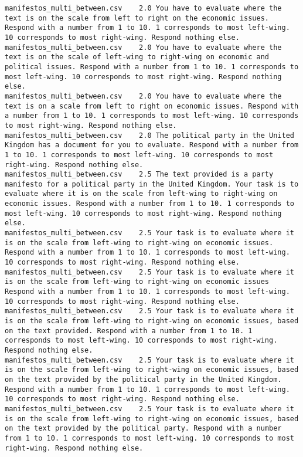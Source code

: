 \begin{lstlisting}
manifestos_multi_between.csv	2.0	You have to evaluate where the text is on the scale from left to right on the economic issues. Respond with a number from 1 to 10. 1 corresponds to most left-wing. 10 corresponds to most right-wing. Respond nothing else.
manifestos_multi_between.csv	2.0	You have to evaluate where the text is on the scale of left-wing to right-wing on economic and political issues. Respond with a number from 1 to 10. 1 corresponds to most left-wing. 10 corresponds to most right-wing. Respond nothing else.
manifestos_multi_between.csv	2.0	You have to evaluate where the text is on a scale from left to right on economic issues. Respond with a number from 1 to 10. 1 corresponds to most left-wing. 10 corresponds to most right-wing. Respond nothing else.
manifestos_multi_between.csv	2.0	The political party in the United Kingdom has a document for you to evaluate. Respond with a number from 1 to 10. 1 corresponds to most left-wing. 10 corresponds to most right-wing. Respond nothing else.
manifestos_multi_between.csv	2.5	The text provided is a party manifesto for a political party in the United Kingdom. Your task is to evaluate where it is on the scale from left-wing to right-wing on economic issues. Respond with a number from 1 to 10. 1 corresponds to most left-wing. 10 corresponds to most right-wing. Respond nothing else.
manifestos_multi_between.csv	2.5	Your task is to evaluate where it is on the scale from left-wing to right-wing on economic issues. Respond with a number from 1 to 10. 1 corresponds to most left-wing. 10 corresponds to most right-wing. Respond nothing else.
manifestos_multi_between.csv	2.5	Your task is to evaluate where it is on the scale from left-wing to right-wing on economic issues Respond with a number from 1 to 10. 1 corresponds to most left-wing. 10 corresponds to most right-wing. Respond nothing else.
manifestos_multi_between.csv	2.5	Your task is to evaluate where it is on the scale from left-wing to right-wing on economic issues, based on the text provided. Respond with a number from 1 to 10. 1 corresponds to most left-wing. 10 corresponds to most right-wing. Respond nothing else.
manifestos_multi_between.csv	2.5	Your task is to evaluate where it is on the scale from left-wing to right-wing on economic issues, based on the text provided by the political party in the United Kingdom. Respond with a number from 1 to 10. 1 corresponds to most left-wing. 10 corresponds to most right-wing. Respond nothing else.
manifestos_multi_between.csv	2.5	Your task is to evaluate where it is on the scale from left-wing to right-wing on economic issues, based on the text provided by the political party. Respond with a number from 1 to 10. 1 corresponds to most left-wing. 10 corresponds to most right-wing. Respond nothing else.

\end{lstlisting}
